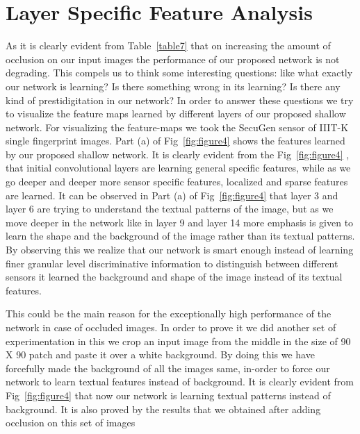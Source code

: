 \section{Layer Specific Feature Analysis}
	As it is clearly evident from Table~\ref{table7} that on increasing the amount of occlusion on our input images the performance of our proposed network is not degrading. This compels us to think some interesting questions: like what exactly our network is learning? Is there something wrong in its learning? Is there any kind of prestidigitation in our network? In order to answer these questions we try to visualize the feature maps learned by different layers of our proposed shallow network. For visualizing the feature-maps we took the SecuGen sensor of IIIT-K single fingerprint images. Part (a) of Fig~\ref{fig:figure4} shows the features learned by our proposed shallow network. It is clearly evident from the Fig~\ref{fig:figure4} , that initial convolutional layers are learning general specific features, while as we go deeper and deeper more sensor specific features, localized and sparse features are learned. It can be observed in Part (a) of Fig~\ref{fig:figure4} that layer 3 and layer 6 are trying to understand the textual patterns of the image, but as we move deeper in the network like in layer 9 and layer 14 more emphasis is given to learn the shape and the background of the image rather than its textual patterns. By observing this we realize that our network is smart enough instead of learning finer granular level discriminative information to distinguish between different sensors it learned the background and shape of the image instead of its textual features.

	This could be the main reason for the exceptionally high performance of the network in case of occluded images. In order to prove it we did another set of experimentation in this we crop an input image from the middle in the size of 90 X 90 patch and paste it over a white background. By doing this we have forcefully made the background of all the images same, in-order to force our network to learn textual features instead of background. It is clearly evident from Fig~\ref{fig:figure4} that now our network is learning textual patterns instead of background. It is also proved by the results that we obtained after adding occlusion on this set of images


